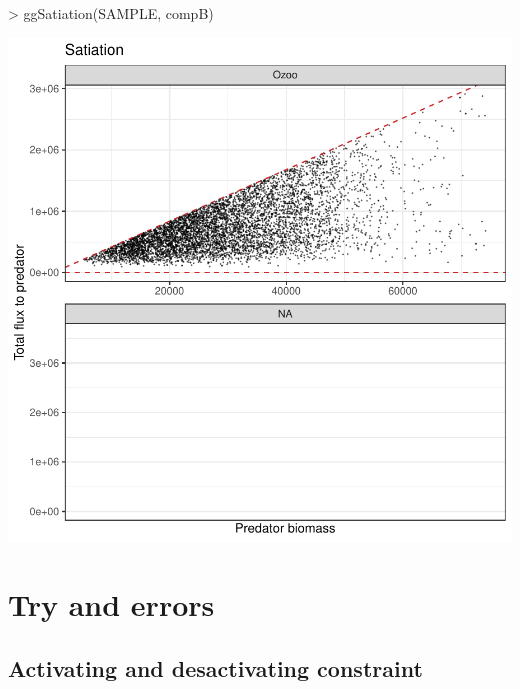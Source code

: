 \documentclass{article}
\begin{document}
\begin{Schunk}
\begin{Sinput}
> ggSatiation(SAMPLE, compB)
\end{Sinput}
\end{Schunk}
\includegraphics{barents_SM-022}

\section{Try and errors}

\subsection{Activating and desactivating constraint}
\end{document}
